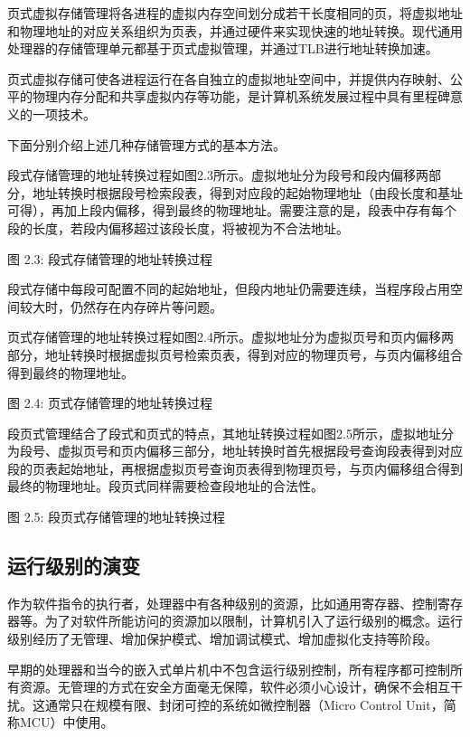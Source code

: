 \documentclass[]{ctexbook}
\begin{document}
页式虚拟存储管理将各进程的虚拟内存空间划分成若干长度相同的页，将虚拟地址和物理地址的对应关系组织为页表，并通过硬件来实现快速的地址转换。现代通用处理器的存储管理单元都基于页式虚拟管理，并通过TLB进行地址转换加速。

页式虚拟存储可使各进程运行在各自独立的虚拟地址空间中，并提供内存映射、公平的物理内存分配和共享虚拟内存等功能，是计算机系统发展过程中具有里程碑意义的一项技术。

下面分别介绍上述几种存储管理方式的基本方法。

段式存储管理的地址转换过程如图2.3所示。虚拟地址分为段号和段内偏移两部分，地址转换时根据段号检索段表，得到对应段的起始物理地址（由段长度和基址可得），再加上段内偏移，得到最终的物理地址。需要注意的是，段表中存有每个段的长度，若段内偏移超过该段长度，将被视为不合法地址。

图 2.3: 段式存储管理的地址转换过程

段式存储中每段可配置不同的起始地址，但段内地址仍需要连续，当程序段占用空间较大时，仍然存在内存碎片等问题。

页式存储管理的地址转换过程如图2.4所示。虚拟地址分为虚拟页号和页内偏移两部分，地址转换时根据虚拟页号检索页表，得到对应的物理页号，与页内偏移组合得到最终的物理地址。

图 2.4: 页式存储管理的地址转换过程

段页式管理结合了段式和页式的特点，其地址转换过程如图2.5所示，虚拟地址分为段号、虚拟页号和页内偏移三部分，地址转换时首先根据段号查询段表得到对应段的页表起始地址，再根据虚拟页号查询页表得到物理页号，与页内偏移组合得到最终的物理地址。段页式同样需要检查段地址的合法性。

图 2.5: 段页式存储管理的地址转换过程

\hypertarget{ux8fd0ux884cux7ea7ux522bux7684ux6f14ux53d8}{%
\subsection{运行级别的演变}\label{ux8fd0ux884cux7ea7ux522bux7684ux6f14ux53d8}}

作为软件指令的执行者，处理器中有各种级别的资源，比如通用寄存器、控制寄存器等。为了对软件所能访问的资源加以限制，计算机引入了运行级别的概念。运行级别经历了无管理、增加保护模式、增加调试模式、增加虚拟化支持等阶段。

早期的处理器和当今的嵌入式单片机中不包含运行级别控制，所有程序都可控制所有资源。无管理的方式在安全方面毫无保障，软件必须小心设计，确保不会相互干扰。这通常只在规模有限、封闭可控的系统如微控制器（Micro Control Unit，简称MCU）中使用。
\end{document}
